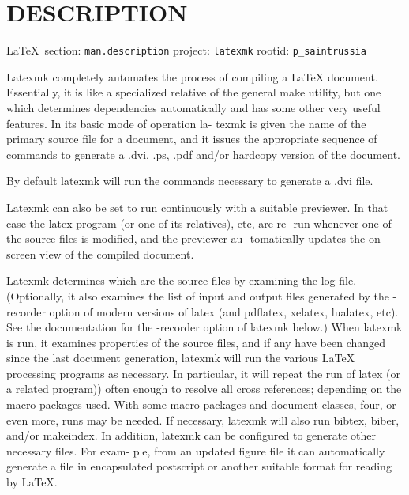  
 

\section{DESCRIPTION}

\vspace{0.5cm}
 {\ifDEBUG\small\LaTeX~section: \verb|man.description| project: \verb|latexmk| rootid: \verb|p_saintrussia| \fi}
\vspace{0.5cm}

Latexmk completely automates the process of compiling a LaTeX document.
Essentially, it is like a specialized  relative  of  the  general  make
utility,  but  one  which determines dependencies automatically and has some
other very useful features.  In its basic mode  of  operation  la- texmk  is
given the name of the primary source file for a document, and it issues the
appropriate sequence of commands to generate a .dvi, .ps, .pdf and/or hardcopy
version of the document.

By  default  latexmk will run the commands necessary to generate a .dvi file.

Latexmk can also be set to run continuously with a suitable  previewer.  In
that case the latex program (or one of its relatives), etc, are re- run
whenever one of the source files is modified, and the previewer au- tomatically
updates the on-screen view of the compiled document.

Latexmk  determines  which  are  the  source files by examining the log file.
(Optionally, it also examines the list of input and output files generated  by
the  -recorder  option  of modern versions of latex (and pdflatex, xelatex,
lualatex,  etc).   See  the  documentation  for  the -recorder  option  of
latexmk below.)  When latexmk is run, it examines properties of the source
files, and if any have been changed since  the last document generation,
latexmk will run the various LaTeX processing programs as necessary.  In
particular, it will repeat the run of  latex (or  a  related program)) often
enough to resolve all cross references; depending on the macro packages used.
With  some  macro  packages  and document classes, four, or even more, runs may
be needed. If necessary, latexmk will also run bibtex, biber, and/or
makeindex.   In  addition, latexmk can be configured to generate other
necessary files.  For exam- ple, from an updated figure file it can
automatically generate  a  file in  encapsulated  postscript  or another
suitable format for reading by LaTeX.

